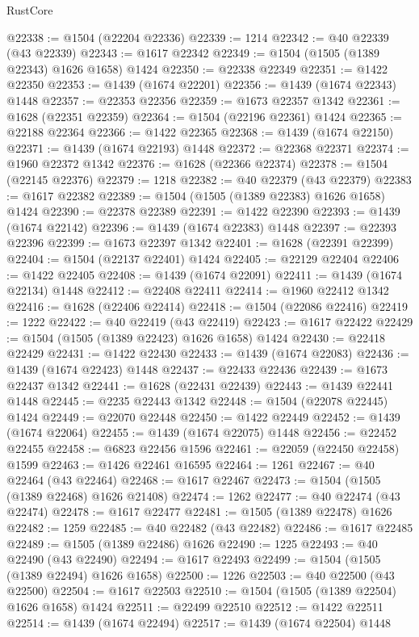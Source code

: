 \begin{lexlean}{RustCore}
\begin{coremodule}
@22338 := @1504 (@22204 @22336)
@22339 := 1214
@22342 := @40 @22339 (@43 @22339)
@22343 := @1617 @22342
@22349 := @1504 (@1505 (@1389 @22343) @1626 @1658) @1424
@22350 := @22338 @22349
@22351 := @1422 @22350
@22353 := @1439 (@1674 @22201)
@22356 := @1439 (@1674 @22343) @1448
@22357 := @22353 @22356
@22359 := @1673 @22357 @1342
@22361 := @1628 (@22351 @22359)
@22364 := @1504 (@22196 @22361) @1424
@22365 := @22188 @22364
@22366 := @1422 @22365
@22368 := @1439 (@1674 @22150)
@22371 := @1439 (@1674 @22193) @1448
@22372 := @22368 @22371
@22374 := @1960 @22372 @1342
@22376 := @1628 (@22366 @22374)
@22378 := @1504 (@22145 @22376)
@22379 := 1218
@22382 := @40 @22379 (@43 @22379)
@22383 := @1617 @22382
@22389 := @1504 (@1505 (@1389 @22383) @1626 @1658) @1424
@22390 := @22378 @22389
@22391 := @1422 @22390
@22393 := @1439 (@1674 @22142)
@22396 := @1439 (@1674 @22383) @1448
@22397 := @22393 @22396
@22399 := @1673 @22397 @1342
@22401 := @1628 (@22391 @22399)
@22404 := @1504 (@22137 @22401) @1424
@22405 := @22129 @22404
@22406 := @1422 @22405
@22408 := @1439 (@1674 @22091)
@22411 := @1439 (@1674 @22134) @1448
@22412 := @22408 @22411
@22414 := @1960 @22412 @1342
@22416 := @1628 (@22406 @22414)
@22418 := @1504 (@22086 @22416)
@22419 := 1222
@22422 := @40 @22419 (@43 @22419)
@22423 := @1617 @22422
@22429 := @1504 (@1505 (@1389 @22423) @1626 @1658) @1424
@22430 := @22418 @22429
@22431 := @1422 @22430
@22433 := @1439 (@1674 @22083)
@22436 := @1439 (@1674 @22423) @1448
@22437 := @22433 @22436
@22439 := @1673 @22437 @1342
@22441 := @1628 (@22431 @22439)
@22443 := @1439 @22441 @1448
@22445 := @2235 @22443 @1342
@22448 := @1504 (@22078 @22445) @1424
@22449 := @22070 @22448
@22450 := @1422 @22449
@22452 := @1439 (@1674 @22064)
@22455 := @1439 (@1674 @22075) @1448
@22456 := @22452 @22455
@22458 := @6823 @22456 @1596
@22461 := @22059 (@22450 @22458) @1599
@22463 := @1426 @22461 @16595
@22464 := 1261
@22467 := @40 @22464 (@43 @22464)
@22468 := @1617 @22467
@22473 := @1504 (@1505 (@1389 @22468) @1626 @21408)
@22474 := 1262
@22477 := @40 @22474 (@43 @22474)
@22478 := @1617 @22477
@22481 := @1505 (@1389 @22478) @1626
@22482 := 1259
@22485 := @40 @22482 (@43 @22482)
@22486 := @1617 @22485
@22489 := @1505 (@1389 @22486) @1626
@22490 := 1225
@22493 := @40 @22490 (@43 @22490)
@22494 := @1617 @22493
@22499 := @1504 (@1505 (@1389 @22494) @1626 @1658)
@22500 := 1226
@22503 := @40 @22500 (@43 @22500)
@22504 := @1617 @22503
@22510 := @1504 (@1505 (@1389 @22504) @1626 @1658) @1424
@22511 := @22499 @22510
@22512 := @1422 @22511
@22514 := @1439 (@1674 @22494)
@22517 := @1439 (@1674 @22504) @1448

\end{coremodule}
\end{lexlean}
